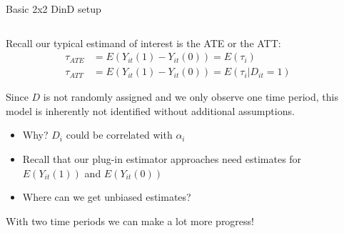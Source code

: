 \documentclass[notes,11pt, aspectratio=169]{beamer}
\newenvironment{wideitemize}{\itemize\addtolength{\itemsep}{10pt}}{\enditemize}
\begin{document}
\begin{frame}{Basic 2x2 DinD setup}
  \begin{columns}[T] %
    \begin{column}{0.8\textwidth}
      \begin{wideitemize}
      \item Recall our typical estimand of interest is the ATE or the ATT:
        \begin{align*}
          \tau_{ATE} &= E(Y_{it}(1) - Y_{it}(0)) = E(\tau_{i})\\
          \tau_{ATT} &= E(Y_{it}(1) - Y_{it}(0)) = E(\tau_{i} |D_{it} = 1)          
        \end{align*}
      \item Since $D$ is not randomly assigned and we only observe one time
        period, this model is inherently not identified without additional assumptions.
        \begin{itemize}
        \item Why? $D_{i}$ could be correlated with $\alpha_{i}$
        \item Recall that our plug-in estimator approaches need
          estimates for $E(Y_{it}(1))$ and $E(Y_{it}(0))$
        \item Where can we get unbiased estimates?
        \end{itemize}
      \item With two time periods we can make a lot more progress!
        \pause
      \end{wideitemize}
    \end{column}%
    \hfill%
    \begin{column}{.45\textwidth}
    \end{column}%
  \end{columns}
\end{frame}
\end{document}
